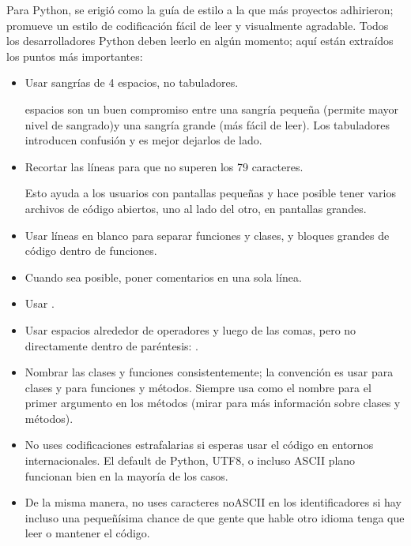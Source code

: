 \documentclass[a5paper,10pt,spanish]{sphinxmanual}
\begin{document}
\sphinxAtStartPar
Para Python,   se erigió como la guía de estilo a la que más proyectos adhirieron; promueve un estilo de codificación fácil de leer y visualmente agradable. Todos los desarrolladores Python deben leerlo en algún momento; aquí están extraídos los puntos más importantes:
\begin{itemize}
\item {} 
\sphinxAtStartPar
Usar sangrías de 4 espacios, no tabuladores.

 espacios son un buen compromiso entre una sangría pequeña (permite mayor nivel de sangrado)y una sangría grande (más fácil de leer). Los tabuladores introducen confusión y es mejor dejarlos de lado.

\item {} 
\sphinxAtStartPar
Recortar las líneas para que no superen los 79 caracteres.

\sphinxAtStartPar
Esto ayuda a los usuarios con pantallas pequeñas y hace posible tener varios archivos de código abiertos, uno al lado del otro, en pantallas grandes.

\item {} 
\sphinxAtStartPar
Usar líneas en blanco para separar funciones y clases, y bloques grandes de código dentro de funciones.

\item {} 
\sphinxAtStartPar
Cuando sea posible, poner comentarios en una sola línea.

\item {} 
\sphinxAtStartPar
Usar .

\item {} 
\sphinxAtStartPar
Usar espacios alrededor de operadores y luego de las comas, pero no directamente dentro de paréntesis: .

\item {} 
\sphinxAtStartPar
Nombrar las clases y funciones consistentemente; la convención es usar  para clases y  para funciones y métodos. Siempre usa  como el nombre para el primer argumento en los métodos (mirar {\hyperref[\detokenize{tutorial/classes:tut-firstclasses}]{}} para más información sobre clases y métodos).

\item {} 
\sphinxAtStartPar
No uses codificaciones estrafalarias si esperas usar el código en entornos internacionales. El default de Python, UTF\sphinxhyphen{}8, o incluso ASCII plano funcionan bien en la mayoría de los casos.

\item {} 
\sphinxAtStartPar
De la misma manera, no uses caracteres no\sphinxhyphen{}ASCII en los identificadores si hay incluso una pequeñísima chance de que gente que hable otro idioma tenga que leer o mantener el código.

\end{itemize}
\end{document}

